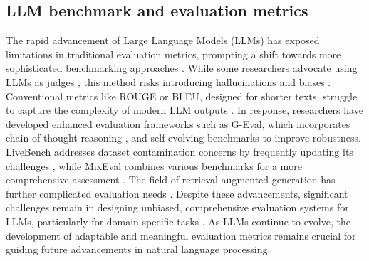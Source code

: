 \subsection{LLM benchmark and evaluation metrics }
The rapid advancement of Large Language Models (LLMs) has exposed limitations in traditional evaluation metrics, prompting a shift towards more sophisticated benchmarking approaches \cite{bavaresco2024llms}. While some researchers advocate using LLMs as judges \cite{zheng2023judging,yu2024evaluation}, this method risks introducing hallucinations and biases \cite{liu2023g}. Conventional metrics like ROUGE or BLEU, designed for shorter texts, struggle to capture the complexity of modern LLM outputs \cite{lin2004rouge,papineni2002bleu}. In response, researchers have developed enhanced evaluation frameworks such as G-Eval, which incorporates chain-of-thought reasoning \cite{wei2022chain}, and self-evolving benchmarks \cite{wang2024benchmark} to improve robustness. LiveBench addresses dataset contamination concerns by frequently updating its challenges \cite{white2024livebench}, while MixEval combines various benchmarks for a more comprehensive assessment \cite{ni2024mixeval}. The field of retrieval-augmented generation has further complicated evaluation needs \cite{lewis2020retrieval}. Despite these advancements, significant challenges remain in designing unbiased, comprehensive evaluation systems for LLMs, particularly for domain-specific tasks \cite{gehrmann2021gem,magesh2024hallucination}. As LLMs continue to evolve, the development of adaptable and meaningful evaluation metrics remains crucial for guiding future advancements in natural language processing.

